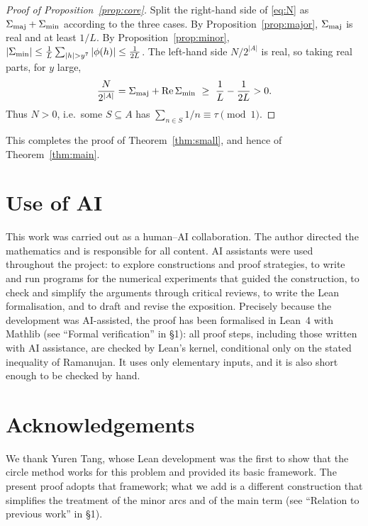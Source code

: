 \documentclass[11pt]{amsart}
\theoremstyle{definition}
\theoremstyle{remark}
\begin{document}
\begin{proof}[Proof of Proposition~\ref{prop:core}]
Split the right-hand side of \eqref{eq:N} as $\Sigma_{\rm maj}+\Sigma_{\rm min}$ according to the three cases. By Proposition~\ref{prop:major}, $\Sigma_{\rm maj}$ is real and at least $1/L$. By Proposition~\ref{prop:minor}, $|\Sigma_{\rm min}|\le\frac1L\sum_{|h|>y^7}|\phi(h)|\le\frac1{2L}$. The left-hand side $N/2^{|A|}$ is real, so taking real parts, for $y$ large,
\[
 \frac{N}{2^{|A|}}=\Sigma_{\rm maj}+\operatorname{Re}\Sigma_{\rm min}\ \ge\ \frac1L-\frac1{2L}>0 .
\]
Thus $N>0$, i.e.\ some $S\subseteq A$ has $\sum_{n\in S}1/n\equiv\tau\pmod1$.
\end{proof}

This completes the proof of Theorem~\ref{thm:small}, and hence of Theorem~\ref{thm:main}.

\section*{Use of AI}
This work was carried out as a human--AI collaboration. The author directed the mathematics and is responsible for all content. AI assistants were used throughout the project: to explore constructions and proof strategies, to write and run programs for the numerical experiments that guided the construction, to check and simplify the arguments through critical reviews, to write the Lean formalisation, and to draft and revise the exposition. Precisely because the development was AI-assisted, the proof has been formalised in Lean~4 with Mathlib (see ``Formal verification'' in \S1): all proof steps, including those written with AI assistance, are checked by Lean's kernel, conditional only on the stated inequality of Ramanujan. It uses only elementary inputs, and it is also short enough to be checked by hand.

\section*{Acknowledgements}
We thank Yuren Tang, whose Lean development \cite{Tan26} was the first to show that the circle method works for this problem and provided its basic framework. The present proof adopts that framework; what we add is a different construction that simplifies the treatment of the minor arcs and of the main term (see ``Relation to previous work'' in \S1).
\end{document}
